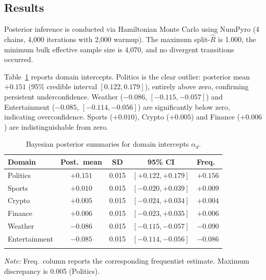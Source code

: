 \documentclass[numsec,webpdf,modern,medium]{oup-authoring-template}
\theoremstyle{thmstyleone}%
\theoremstyle{thmstyletwo}%
\theoremstyle{thmstylethree}%
\begin{document}
\subsection{Results}\label{sec:bayesian_results}

Posterior inference is conducted via Hamiltonian Monte Carlo \citep{neal2011mcmc,betancourt2017conceptual} using NumPyro \citep{phan2019composable} (4 chains, 4,000 iterations with 2,000 warmup). The maximum split-$\hat{R}$ \citep{vehtari2021rank,brooks1998general} is 1.000, the minimum bulk effective sample size is 4,070, and no divergent transitions occurred.

Table~\ref{tab:bayesian_intercepts} reports domain intercepts. Politics is the clear outlier: posterior mean $+0.151$ (95\% credible interval $[0.122, 0.179]$), entirely above zero, confirming persistent underconfidence. Weather ($-0.086$, $[-0.115, -0.057]$) and Entertainment ($-0.085$, $[-0.114, -0.056]$) are significantly below zero, indicating overconfidence. Sports ($+0.010$), Crypto ($+0.005$) and Finance ($+0.006$) are indistinguishable from zero.

\begin{table}[!t]
\caption{Bayesian posterior summaries for domain intercepts $\alpha_d$.\label{tab:bayesian_intercepts}}%
\begin{tabular*}{\columnwidth}{@{\extracolsep\fill}lcccc@{\extracolsep\fill}}
\toprule
Domain & Post.\ mean & SD & 95\% CI & Freq.\ \\
\midrule
Politics      & $+0.151$ & 0.015 & $[+0.122, +0.179]$ & $+0.156$ \\
Sports        & $+0.010$ & 0.015 & $[-0.020, +0.039]$ & $+0.009$ \\
Crypto        & $+0.005$ & 0.015 & $[-0.024, +0.034]$ & $+0.004$ \\
Finance       & $+0.006$ & 0.015 & $[-0.023, +0.035]$ & $+0.006$ \\
Weather       & $-0.086$ & 0.015 & $[-0.115, -0.057]$ & $-0.090$ \\
Entertainment & $-0.085$ & 0.015 & $[-0.114, -0.056]$ & $-0.086$ \\
\botrule
\end{tabular*}
\begin{tablenotes}%
\item \emph{Note:} Freq.\ column reports the corresponding frequentist estimate. Maximum discrepancy is 0.005 (Politics).
\end{tablenotes}
\end{table}
\end{document}
